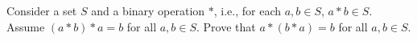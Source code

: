 Consider a set $S$ and a binary operation $*$, i.e., for each $a,b\in S$,
$a*b\in S$.  Assume $(a*b)*a=b$ for all $a,b\in S$.  Prove that
$a*(b*a)=b$ for all $a,b\in S$.

